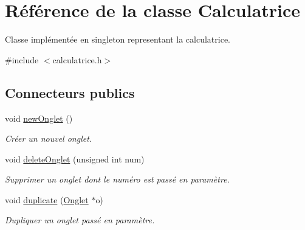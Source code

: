 \hypertarget{class_calculatrice}{\section{Référence de la classe Calculatrice}
\label{class_calculatrice}
}


Classe implémentée en singleton representant la calculatrice.  




{\ttfamily \#include $<$calculatrice.\-h$>$}

\subsection*{Connecteurs publics}
\begin{DoxyCompactItemize}
\item 
\hypertarget{class_calculatrice_ac83678d76129e12d86d316966469d4fe}{void \hyperlink{class_calculatrice_ac83678d76129e12d86d316966469d4fe}{new\-Onglet} ()}\label{class_calculatrice_ac83678d76129e12d86d316966469d4fe}

\begin{DoxyCompactList}\small\item\em Créer un nouvel onglet. \end{DoxyCompactList}\item 
void \hyperlink{class_calculatrice_a374f8583ea2be07558de4f7b47d68421}{delete\-Onglet} (unsigned int num)
\begin{DoxyCompactList}\small\item\em Supprimer un onglet dont le numéro est passé en paramètre. \end{DoxyCompactList}\item 
void \hyperlink{class_calculatrice_afc5406fddd1ac357a7c47fa8dd16b5ab}{duplicate} (\hyperlink{class_onglet}{Onglet} $\ast$o)
\begin{DoxyCompactList}\small\item\em Dupliquer un onglet passé en paramètre. \end{DoxyCompactList}\end{DoxyCompactItemize}
